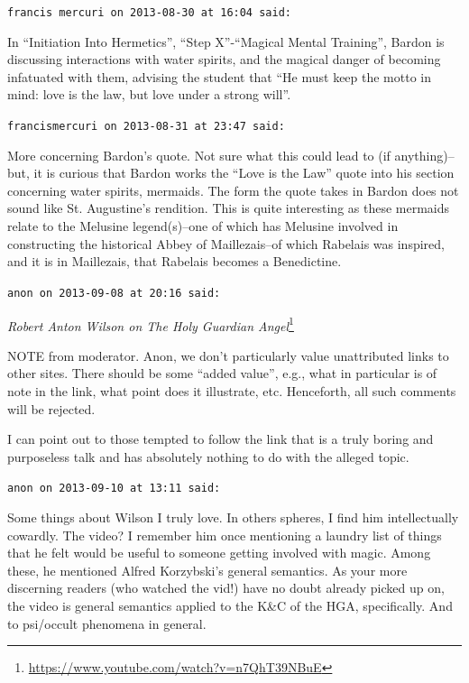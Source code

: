 \begin{footnotesize}
\begin{sffamily}
\hfill

\texttt{francis mercuri on 2013-08-30 at 16:04 said:}

In ``Initiation Into Hermetics'', ``Step X''-``Magical Mental Training'', Bardon is discussing interactions with water spirits, and the magical danger of becoming infatuated with them, advising the student that ``He must keep the motto in mind: love is the law, but love under a strong will''.

\hfill

\texttt{francismercuri on 2013-08-31 at 23:47 said:}

More concerning Bardon's quote. Not sure what this could lead to (if anything)--but, it is curious that Bardon works the ``Love is the Law'' quote into his section concerning water spirits, mermaids. The form the quote takes in Bardon does not sound like St. Augustine's rendition. This is quite interesting as these mermaids relate to the Melusine legend(s)--one of which has Melusine involved in constructing the historical Abbey of Maillezais--of which Rabelais was inspired, and it is in Maillezais, that Rabelais becomes a Benedictine.

\hfill

\texttt{anon on 2013-09-08 at 20:16 said:}

\textit{Robert Anton Wilson on The Holy Guardian Angel}\footnote{\url{https://www.youtube.com/watch?v=n7QhT39NBuE}}

NOTE from moderator. Anon, we don't particularly value unattributed links to other sites. There should be some ``added value'', e.g., what in particular is of note in the link, what point does it illustrate, etc. Henceforth, all such comments will be rejected.

I can point out to those tempted to follow the link that is a truly boring and purposeless talk and has absolutely nothing to do with the alleged topic.

\hfill

\texttt{anon on 2013-09-10 at 13:11 said:}

Some things about Wilson I truly love. In others spheres, I find him intellectually cowardly. The video? I remember him once mentioning a laundry list of things that he felt would be useful to someone getting involved with magic. Among these, he mentioned Alfred Korzybski's general semantics. As your more discerning readers (who watched the vid!) have no doubt already picked up on, the video is general semantics applied to the K\&C of the HGA, specifically. And to psi/occult phenomena in general.


\end{sffamily}
\end{footnotesize}
